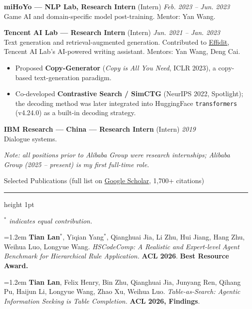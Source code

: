 \documentclass[10.5pt]{article}
\newcommand{\cvsection}[1]{%
  \vspace{10pt}
  {\color{accent}\headingfont\Large #1}\par
  \vspace{2pt}
  {\color{accent}\hrule height 1pt}
  \vspace{6pt}
}
\newcommand{\pubitem}[1]{\par\noindent\hangindent=1.2em\hangafter=1 #1\par\vspace{4pt}}
\newcommand{\venue}[1]{\textbf{\color{accent}#1}}
\begin{document}
\textbf{miHoYo --- NLP Lab, Research Intern} {\small\color{muted}(Intern)} \hfill \textit{Feb. 2023 -- Jun. 2023}\\
Game AI and domain-specific model post-training. Mentor: Yan Wang.

\textbf{Tencent AI Lab --- Research Intern} {\small\color{muted}(Intern)} \hfill \textit{Jun. 2021 -- Jan. 2023}\\
Text generation and retrieval-augmented generation. Contributed to \href{https://effidit.qq.com}{Effidit}, Tencent AI Lab's AI-powered writing assistant. Mentors: Yan Wang, Deng Cai.
\begin{itemize}
  \item Proposed \textbf{Copy-Generator} (\textit{Copy is All You Need}, ICLR 2023), a copy-based text-generation paradigm.
  \item Co-developed \textbf{Contrastive Search / SimCTG} (NeurIPS 2022, Spotlight); the decoding method was later integrated into HuggingFace \texttt{transformers} (v4.24.0) as a built-in decoding strategy.
\end{itemize}

\textbf{IBM Research --- China --- Research Intern} {\small\color{muted}(Intern)} \hfill \textit{2019}\\
Dialogue systems.

\vspace{4pt}
{\small\itshape\color{muted} Note: all positions prior to Alibaba Group were research internships; Alibaba Group (2025 -- present) is my first full-time role.}

\cvsection{Selected Publications \small\normalfont(full list on \href{https://scholar.google.com/citations?user=B0W47gsAAAAJ&hl=zh-CN}{Google Scholar}, 1{,}700+ citations)}
{\small \textit{$^{*}$ indicates equal contribution.}}\par\vspace{4pt}

\pubitem{\textbf{Tian Lan}$^{*}$, Yiqian Yang$^{*}$, Qianghuai Jia, Li Zhu, Hui Jiang, Hang Zhu, Weihua Luo, Longyue Wang. \textit{HSCodeComp: A Realistic and Expert-level Agent Benchmark for Hierarchical Rule Application.} \venue{ACL 2026}. \textbf{Best Resource Award.}}

\pubitem{\textbf{Tian Lan}, Felix Henry, Bin Zhu, Qianghuai Jia, Junyang Ren, Qihang Pu, Haijun Li, Longyue Wang, Zhao Xu, Weihua Luo. \textit{Table-as-Search: Agentic Information Seeking is Table Completion.} \venue{ACL 2026, Findings}.}
\end{document}
